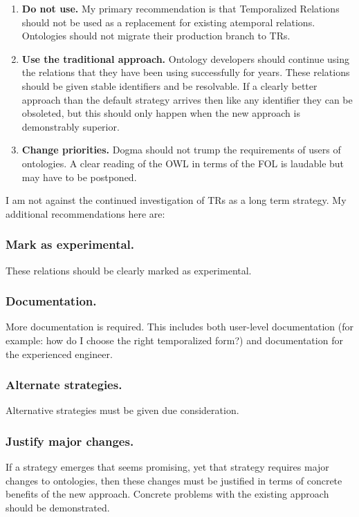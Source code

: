\documentclass{bioinfo}
\begin{document}
\begin{enumerate}

\item \textbf{Do not use.} My primary recommendation is that
  Temporalized Relations should not be used as a replacement for
  existing atemporal relations. Ontologies should not migrate their
  production branch to TRs.

\item \textbf{Use the traditional approach.} Ontology developers
  should continue using the relations that they have been using
  successfully for years. These relations should be given stable
  identifiers and be resolvable. If a clearly better approach than the
  default strategy arrives then like any identifier they can be
  obsoleted, but this should only happen when the new approach is
  demonstrably superior.

\item \textbf{Change priorities.} Dogma should not trump the
  requirements of users of ontologies. A clear reading of the OWL in
  terms of the FOL is laudable but may have to be postponed.

\end{enumerate}


I am not against the continued investigation of TRs as a long term
strategy. My additional recommendations here are:

\subsubsection{Mark as experimental.} These relations should be clearly
marked as experimental.

\subsubsection{Documentation.} More documentation is required. This
includes both user-level documentation (for example: how do I choose
the right temporalized form?) and documentation for the experienced
engineer.

\subsubsection{Alternate strategies.} Alternative strategies must be
given due consideration.

\subsubsection{Justify major changes.} If a strategy emerges that
seems promising, yet that strategy requires major changes to
ontologies, then these changes must be justified in terms of concrete
benefits of the new approach. Concrete problems with the existing
approach should be demonstrated.
\end{document}
